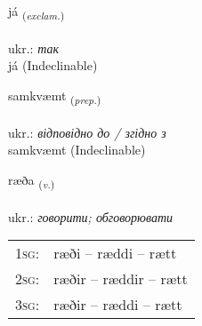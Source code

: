 \documentclass[frontgrid, backgrid]{flacards}\usepackage[]{graphicx}\usepackage[]{xcolor}
\begin{document}
{já \small{\textsubscript{(\textit{exclam.})}} \\[1ex]
\textphonetic{[jauː]} \\
ukr.: \emph{так} \\  [2ex]
já (Indeclinable)}


\renewcommand{\flhead}{\vskip5pt \fboxsep=0pt {\small\bfseries\footnotesize Forsetning | прийменник}}
\renewcommand{\fcfoot}{\vskip5pt \fboxsep=0pt \hspace{2pt}{\small\bfseries\footnotesize 1K}}

\renewcommand{\blhead}{\vskip5pt {\small\bfseries\footnotesize Forsetning | прийменник }}
\renewcommand{\bcfoot}{\vskip5pt \hspace{2pt}{\small\bfseries\footnotesize 1K}}


{samkvæmt \small{\textsubscript{(\textit{prep.})}} \\[1ex]
\textphonetic{[samkʰvaim̥t]} \\
ukr.: \emph{відповідно до / згідно з} \\  [2ex]
samkvæmt (Indeclinable)}

\renewcommand{\flhead}{\vskip5pt \fboxsep=0pt {\small\bfseries\footnotesize Sagnorð | дієслово}}
\renewcommand{\fcfoot}{\vskip5pt \fboxsep=0pt \hspace{2pt}{\small\bfseries\footnotesize 1K}}

\renewcommand{\blhead}{\vskip5pt {\small\bfseries\footnotesize Sagnorð | дієслово }}
\renewcommand{\bcfoot}{\vskip5pt \hspace{2pt}{\small\bfseries\footnotesize 1K}}


{ræða \small{\textsubscript{(\textit{v.})}} \\[1ex] %
\textphonetic{[raiːða]} \\
ukr.: \emph{говорити; обговорювати} \\  [2ex]
\renewcommand*{\arraystretch}{0.8}
\begin{tabular}{p{1cm}l}
\textsc{1sg}: & ræði -- ræddi -- rætt \\ 
\textsc{2sg}: & ræðir -- ræddir -- rætt \\ 
\textsc{3sg}: & ræðir -- ræddi -- rætt \\ 
\end{tabular}
}
\end{document}
